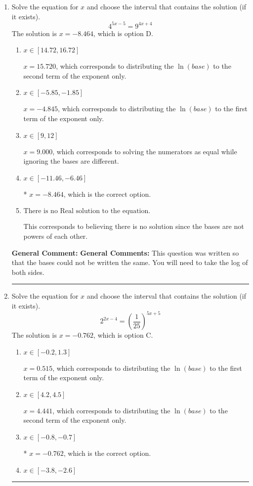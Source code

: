 \documentclass{extbook}[14pt]
\newcommand{\litem}[1]{\item #1

\rule{\textwidth}{0.4pt}}
\begin{document}
\begin{enumerate}\litem{
Solve the equation for $x$ and choose the interval that contains the solution (if it exists).
\[ 4^{5x-5} = 9^{4x+4} \]
The solution is \( x = -8.464 \), which is option D.\begin{enumerate}[label=\Alph*.]
\item \( x \in [14.72, 16.72] \)

$x = 15.720$, which corresponds to distributing the $\ln(base)$ to the second term of the exponent only.
\item \( x \in [-5.85, -1.85] \)

$x = -4.845$, which corresponds to distributing the $\ln(base)$ to the first term of the exponent only.
\item \( x \in [9, 12] \)

$x = 9.000$, which corresponds to solving the numerators as equal while ignoring the bases are different.
\item \( x \in [-11.46, -6.46] \)

* $x = -8.464$, which is the correct option.
\item \( \text{There is no Real solution to the equation.} \)

This corresponds to believing there is no solution since the bases are not powers of each other.
\end{enumerate}

\textbf{General Comment:} \textbf{General Comments:} This question was written so that the bases could not be written the same. You will need to take the log of both sides.
}
\litem{
Solve the equation for $x$ and choose the interval that contains the solution (if it exists).
\[ 2^{2x-4} = \left(\frac{1}{25}\right)^{5x+5} \]
The solution is \( x = -0.762 \), which is option C.\begin{enumerate}[label=\Alph*.]
\item \( x \in [-0.2, 1.3] \)

$x = 0.515$, which corresponds to distributing the $\ln(base)$ to the first term of the exponent only.
\item \( x \in [4.2, 4.5] \)

$x = 4.441$, which corresponds to distributing the $\ln(base)$ to the second term of the exponent only.
\item \( x \in [-0.8, -0.7] \)

* $x = -0.762$, which is the correct option.
\item \( x \in [-3.8, -2.6] \)


\end{enumerate}}
\end{enumerate}
\end{document}
